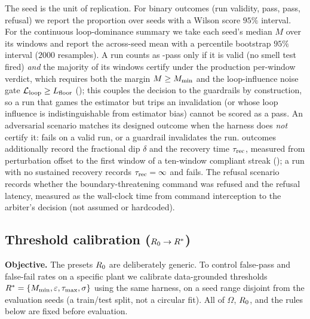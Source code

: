 \documentclass[11pt]{article}
\begin{document}
The seed is the unit of replication. For binary outcomes (run validity, \NC pass, \SC pass, refusal) we report the proportion over seeds with a Wilson score $95\%$ interval. For the continuous loop-dominance summary we take each seed's median $M$ over its windows and report the across-seed mean with a percentile bootstrap $95\%$ interval ($2000$ resamples). A run counts as \NC-pass only if it is valid (no smell test fired) \emph{and} the majority of its windows certify under the production per-window verdict, which requires both the margin $M \geq M_{\min}$ and the loop-influence noise gate $\mathcal{L}_{\text{loop}} \geq L_{\text{floor}}$ (); this couples the decision to the guardrails by construction, so a run that games the estimator but trips an invalidation (or whose loop influence is indistinguishable from estimator bias) cannot be scored as a pass. An adversarial scenario matches its designed outcome when the harness does \emph{not} certify it: \NC fails on a valid run, or a guardrail invalidates the run. \SC outcomes additionally record the fractional dip $\delta$ and the recovery time $\tau_{\text{rec}}$, measured from perturbation offset to the first window of a ten-window compliant streak (); a run with no sustained recovery records $\tau_{\text{rec}} = \infty$ and fails. The refusal scenario records whether the boundary-threatening command was refused and the refusal latency, measured as the wall-clock time from command interception to the arbiter's decision (not assumed or hardcoded).

\subsection{Threshold calibration ($R_0 \rightarrow R^*$)}
\label{sec:methods_calibration}

\textbf{Objective.} The presets $R_0$ are deliberately generic. To control false-pass and false-fail rates on a specific plant we calibrate data-grounded thresholds $R^* = \{M_{\min}, \varepsilon, \tau_{\max}, \sigma\}$ using the same harness, on a seed range disjoint from the evaluation seeds (a train/test split, not a circular fit). All of $\Omega$, $R_0$, and the rules below are fixed before evaluation.
\end{document}
